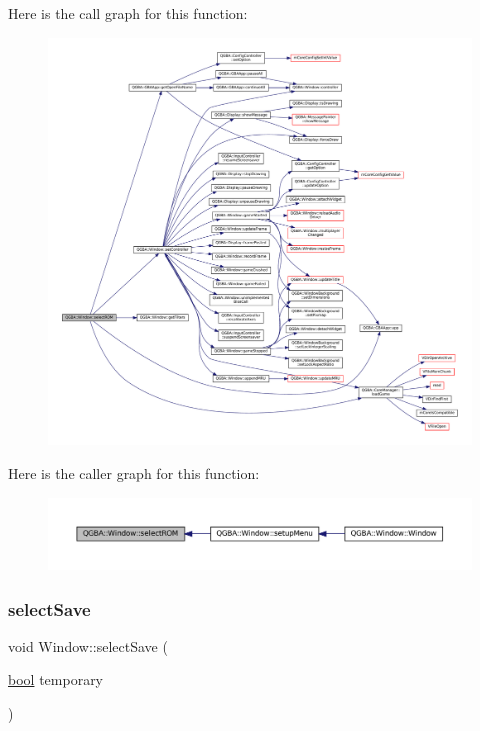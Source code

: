 Here is the call graph for this function\+:
\nopagebreak
\begin{figure}[H]
\begin{center}
\leavevmode
\includegraphics[width=350pt]{class_q_g_b_a_1_1_window_a11460c0780140a4c0ebac4d51b4f1a5d_cgraph}
\end{center}
\end{figure}
Here is the caller graph for this function\+:
\nopagebreak
\begin{figure}[H]
\begin{center}
\leavevmode
\includegraphics[width=350pt]{class_q_g_b_a_1_1_window_a11460c0780140a4c0ebac4d51b4f1a5d_icgraph}
\end{center}
\end{figure}
\mbox{\label{class_q_g_b_a_1_1_window_a5b8372017cd7411b77a865eca2078b75}} 
\subsubsection{\texorpdfstring{select\+Save}{selectSave}}
{\footnotesize\ttfamily void Window\+::select\+Save (\begin{DoxyParamCaption}\item[{\mbox{\hyperlink{libretro_8h_a4a26dcae73fb7e1528214a068aca317e}{bool}}}]{temporary }\end{DoxyParamCaption})\hspace{0.3cm}{\ttfamily [slot]}}

